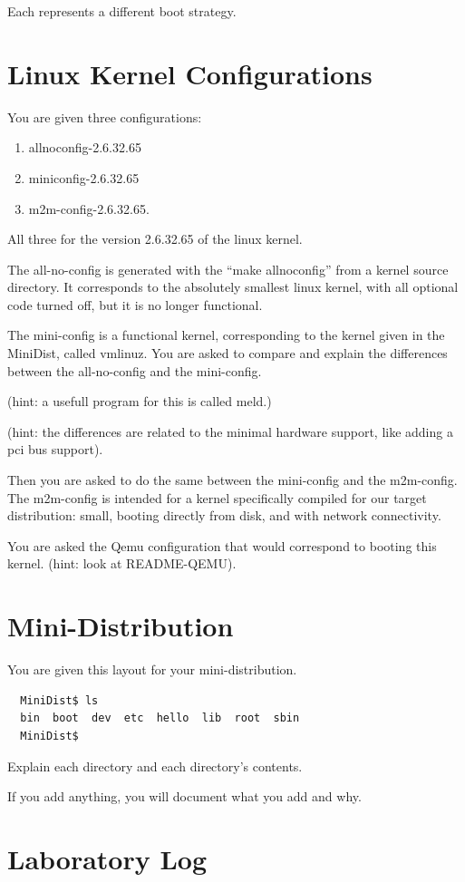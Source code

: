 \documentclass[10]{article}
\begin{document}
Each represents a different boot strategy.

\section{Linux Kernel Configurations}
\label{sec:linux:kernel:config}

You are given three configurations:

\begin{enumerate}
\item allnoconfig-2.6.32.65
\item miniconfig-2.6.32.65
\item m2m-config-2.6.32.65.
\end{enumerate}

All three for the version 2.6.32.65 of the linux kernel.

The all-no-config is generated with the ``make allnoconfig''
from a kernel source directory. It corresponds to the absolutely
smallest linux kernel, with all optional code turned off,
but it is no longer functional.

The mini-config is a functional kernel, corresponding to the
kernel given in the MiniDist, called vmlinuz. You are asked
to compare and explain the differences between the all-no-config
and the mini-config. 

\noindent (hint: a usefull program for this is called meld.)

\noindent (hint: the differences are related to the minimal
hardware support, like adding a pci bus support).

Then you are asked to do the same between the mini-config
and the m2m-config. The m2m-config is intended for a kernel
specifically compiled for our target distribution: small,
booting directly from disk, and with network connectivity.

You are asked the Qemu configuration that would correspond
to booting this kernel. (hint: look at README-QEMU).


\section{Mini-Distribution}

You are given this layout for your mini-distribution.
{\em\small 
\begin{verbatim}
  MiniDist$ ls
  bin  boot  dev  etc  hello  lib  root  sbin
  MiniDist$
\end{verbatim}
}

Explain each directory and each directory's contents.

If you add anything, you will document what you add and why.

\section{Laboratory Log}
\end{document}
